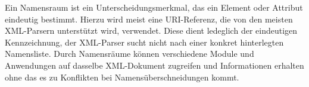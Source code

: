 Ein Namensraum ist ein Unterscheidungsmerkmal, das ein Element oder Attribut eindeutig bestimmt. Hierzu wird meist eine URI-Referenz, die von den meisten XML-Parsern unterstützt wird, verwendet. Diese dient ledeglich der eindeutigen Kennzeichnung, der XML-Parser sucht nicht nach einer konkret hinterlegten Namensliste. Durch Namensräume können verschiedene Module und Anwendungen auf dasselbe XML-Dokument zugreifen und Informationen erhalten ohne das es zu Konflikten bei Namensüberschneidungen kommt. 












